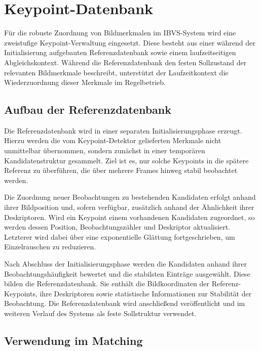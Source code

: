 \section{Keypoint-Datenbank}
\label{sec:keypoint_datenbank}

Für die robuste Zuordnung von Bildmerkmalen im \ac{IBVS}-System wird eine zweistufige Keypoint-Verwaltung eingesetzt. Diese besteht aus einer während der Initialisierung aufgebauten Referenzdatenbank sowie einem laufzeitseitigen Abgleichskontext. Während die Referenzdatenbank den festen Sollzustand der relevanten Bildmerkmale beschreibt, unterstützt der Laufzeitkontext die Wiederzuordnung dieser Merkmale im Regelbetrieb.

\subsection{Aufbau der Referenzdatenbank}
\label{subsec:aufbau_referenzdatenbank}

Die Referenzdatenbank wird in einer separaten Initialisierungsphase erzeugt. Hierzu werden die vom Keypoint-Detektor gelieferten Merkmale nicht unmittelbar übernommen, sondern zunächst in einer temporären Kandidatenstruktur gesammelt. Ziel ist es, nur solche Keypoints in die spätere Referenz zu überführen, die über mehrere Frames hinweg stabil beobachtet werden.

Die Zuordnung neuer Beobachtungen zu bestehenden Kandidaten erfolgt anhand ihrer Bildposition und, sofern verfügbar, zusätzlich anhand der Ähnlichkeit ihrer Deskriptoren. Wird ein Keypoint einem vorhandenen Kandidaten zugeordnet, so werden dessen Position, Beobachtungszähler und Deskriptor aktualisiert. Letzterer wird dabei über eine exponentielle Glättung fortgeschrieben, um Einzelrauschen zu reduzieren.

Nach Abschluss der Initialisierungsphase werden die Kandidaten anhand ihrer Beobachtungshäufigkeit bewertet und die stabilsten Einträge ausgewählt. Diese bilden die Referenzdatenbank. Sie enthält die Bildkoordinaten der Referenz-Keypoints, ihre Deskriptoren sowie statistische Informationen zur Stabilität der Beobachtung. Die Referenzdatenbank wird anschließend veröffentlicht und im weiteren Verlauf des Systems als feste Sollstruktur verwendet.

\subsection{Verwendung im Matching}
\label{subsec:verwendung_im_matching}

